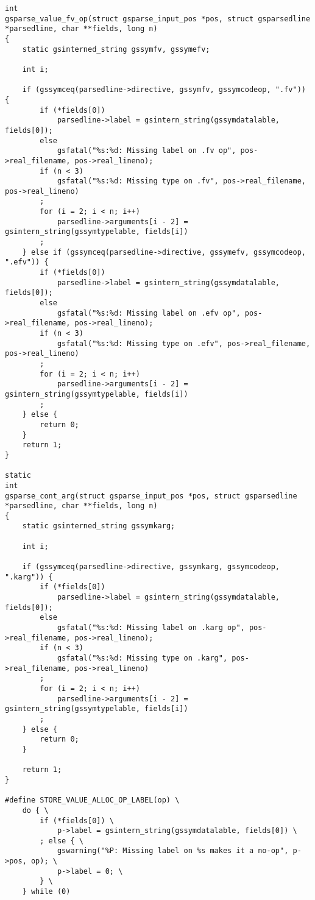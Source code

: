 \documentclass{report}
\begin{document}
\begin{verbatim}
int
gsparse_value_fv_op(struct gsparse_input_pos *pos, struct gsparsedline *parsedline, char **fields, long n)
{
    static gsinterned_string gssymfv, gssymefv;

    int i;

    if (gssymceq(parsedline->directive, gssymfv, gssymcodeop, ".fv")) {
        if (*fields[0])
            parsedline->label = gsintern_string(gssymdatalable, fields[0]);
        else
            gsfatal("%s:%d: Missing label on .fv op", pos->real_filename, pos->real_lineno);
        if (n < 3)
            gsfatal("%s:%d: Missing type on .fv", pos->real_filename, pos->real_lineno)
        ;
        for (i = 2; i < n; i++)
            parsedline->arguments[i - 2] = gsintern_string(gssymtypelable, fields[i])
        ;
    } else if (gssymceq(parsedline->directive, gssymefv, gssymcodeop, ".efv")) {
        if (*fields[0])
            parsedline->label = gsintern_string(gssymdatalable, fields[0]);
        else
            gsfatal("%s:%d: Missing label on .efv op", pos->real_filename, pos->real_lineno);
        if (n < 3)
            gsfatal("%s:%d: Missing type on .efv", pos->real_filename, pos->real_lineno)
        ;
        for (i = 2; i < n; i++)
            parsedline->arguments[i - 2] = gsintern_string(gssymtypelable, fields[i])
        ;
    } else {
        return 0;
    }
    return 1;
}

static
int
gsparse_cont_arg(struct gsparse_input_pos *pos, struct gsparsedline *parsedline, char **fields, long n)
{
    static gsinterned_string gssymkarg;

    int i;

    if (gssymceq(parsedline->directive, gssymkarg, gssymcodeop, ".karg")) {
        if (*fields[0])
            parsedline->label = gsintern_string(gssymdatalable, fields[0]);
        else
            gsfatal("%s:%d: Missing label on .karg op", pos->real_filename, pos->real_lineno);
        if (n < 3)
            gsfatal("%s:%d: Missing type on .karg", pos->real_filename, pos->real_lineno)
        ;
        for (i = 2; i < n; i++)
            parsedline->arguments[i - 2] = gsintern_string(gssymtypelable, fields[i])
        ;
    } else {
        return 0;
    }

    return 1;
}

#define STORE_VALUE_ALLOC_OP_LABEL(op) \
    do { \
        if (*fields[0]) \
            p->label = gsintern_string(gssymdatalable, fields[0]) \
        ; else { \
            gswarning("%P: Missing label on %s makes it a no-op", p->pos, op); \
            p->label = 0; \
        } \
    } while (0)


\end{verbatim}
\end{document}
